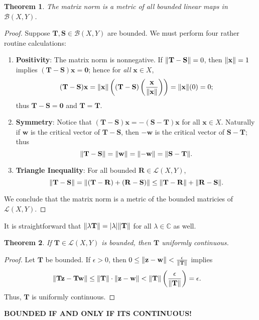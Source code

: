 \documentclass[11pt]{article}
\newtheorem{theorem}{Theorem}
\renewcommand{\vec}[1]{\mathbf{#1}}
\newcommand{\mat}[1]{\mathbf{#1}}
\begin{document}
\begin{theorem}
  The matrix norm is a metric of all bounded linear maps in $\mathcal{B}(X, Y)$.
\end{theorem}
\begin{adjustwidth}{0.5cm}{}
	\begin{proof}
		Suppose $\mat{T}, \mat{S} \in \mathcal{B}(X, Y)$ are bounded. We must perform four rather routine calculations:
		\begin{enumerate}
			\item \textbf{Positivity}: The matrix norm is nonnegative. If $\norm{\mat{T} - \mat{S}} = 0$, then $\norm{\vec{x}} = 1$ implies $(\mat{T} - \mat{S}) \vec{x} = \vec{0}$; hence for \textit{all} $\vec{x} \in X$,
			\[
				(\mat{T} - \mat{S}) \vec{x} = \norm{\vec{x}} \left( (\mat{T} - \mat{S}) \left( \frac{\vec{\vec{x}}}{\norm{\vec{x}}} \right) \right) = \norm{\vec{x}} (0) = 0;
			\]	
			thus $\mat{T} - \mat{S} = \mat{0}$ and $\mat{T} = \mat{T}$.
			\item \textbf{Symmetry}: Notice that $(\mat{T} - \mat{S}) \vec{x} = - (\mat{S} - \mat{T}) \vec{x}$ for all $\vec{x} \in X$. Naturally if $\vec{w}$ is the critical vector of $\mat{T} - \mat{S}$, then $- \vec{w}$ is the critical vector of $\mat{S} - \mat{T}$; thus
			\[
				\norm{\mat{T} - \mat{S}} = \norm{\vec{w}} = \norm{-\vec{w}} = \norm{\mat{S} - \mat{T}}.
			\]	
			\item \textbf{Triangle Inequality}: For all bounded $\mat{R} \in \mathcal{L}(X, Y)$,
			\[
				\norm{\mat{T - S}} = \norm{\mat{(T - R) + (R - S)}} \le \norm{\mat{T - R}} + \norm{\mat{R - S}}.
			\]
		\end{enumerate}
		We conclude that the matrix norm is a metric of the bounded matricies of $\mathcal{L}(X, Y)$.
	\end{proof}
\end{adjustwidth}

It is straightforward that $\norm{\lambda \mat{T}} = \abs{\lambda} \norm{\mat{T}}$ for all $\lambda \in \mathbb{C}$ as well.

\newpage

\begin{theorem}
	If $\mat{T} \in \mathcal{L}(X, Y)$ is bounded, then $\mat{T}$ uniformly continuous.
\end{theorem}
\begin{adjustwidth}{0.5cm}{}
  \begin{proof}
    Let $\mat{T}$ be bounded. If $\epsilon > 0$, then $0 \le \norm{\vec{z} - \vec{w}} < \tfrac{\epsilon}{\norm{\mat{T}}}$ implies
		\begin{align*}
			\norm{\mat{T} \vec{z} - \mat{T} \vec{w}} &\le \norm{\mat{T}} \cdot \norm{\vec{z} - \vec{w}} < \norm{\mat{T}} \left( \frac{\epsilon}{\norm{\mat{T}}} \right) = \epsilon.
		\end{align*}
		Thus, $\mat{T}$ is uniformly continuous.
	\end{proof}
\end{adjustwidth}

\textbf{BOUNDED IF AND ONLY IF ITS CONTINUOUS!}

\end{document}
